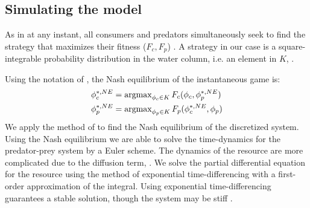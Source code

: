 \subsection{Simulating the model}




As in  at any instant, all consumers and predators simultaneously seek to find the strategy that maximizes their fitness ($F_c, F_p$) . A strategy in our case is a square-integrable probability distribution in the water column, i.e. an element in $K$, .

Using the notation of , the Nash equilibrium of the instantaneous game is:
\begin{equation}
  \label{eq:nash_equilibria}
  \begin{split}
  	\phi_c^{*,NE} &=  \argmax_{\phi_c \in K}  F_c(\phi_c, \phi_p^{*,NE}) \\
  	\phi_p^{*,NE} &=  \argmax_{\phi_p \in K} F_p(\phi_c^{*,NE}, \phi_p)
  \end{split}
\end{equation}
We apply the method of  to find the Nash equilibrium of the discretized system. Using the Nash equilibrium  we are able to solve the time-dynamics for the predator-prey system  by a Euler scheme. The dynamics of the resource are more complicated due to the diffusion term, . We solve the partial differential equation for the resource using the method of exponential time-differencing \citep{hochbruck2010exponential} with a first-order approximation of the integral. Using exponential time-differencing guarantees a stable solution, though the system may be stiff \cite{hochbruck2010exponential}.

